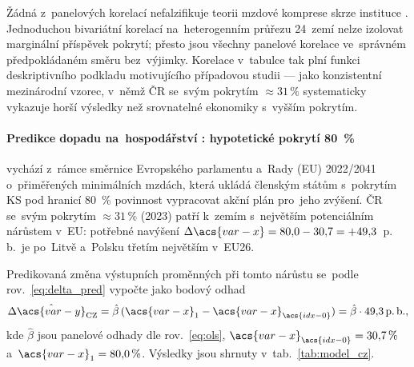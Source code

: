 Žádná z~panelových korelací nefalzifikuje teorii mzdové komprese skrze
instituce . Jednoduchou bivariátní korelací na~heterogenním průřezu
24~zemí nelze izolovat marginální příspěvek pokrytí; přesto jsou všechny
panelové korelace ve~správném předpokládaném směru bez~výjimky. Korelace
v~tabulce tak plní funkci deskriptivního podkladu motivujícího případovou
studii  --- jako konzistentní mezinárodní vzorec, v~němž \Ac{ČR}
se~svým pokrytím $\approx 31\,\%$ systematicky vykazuje horší výsledky než
srovnatelné ekonomiky s~vyšším pokrytím.

\paragraph{Predikce dopadu na~hospodářství : hypotetické pokrytí 80~\%}\label{par:predikce} vychází z~rámce směrnice Evropského parlamentu a~Rady (\acs{EU}) 2022/2041 o~přiměřených
minimálních mzdách, která ukládá členským státům
s~pokrytím \acs{KS} pod hranicí 80~\% povinnost vypracovat akční plán
pro~jeho zvýšení. \Ac{ČR} se~svým pokrytím $\approx 31\,\%$ (2023) patří
k~zemím s~největším potenciálním nárůstem v~\acs{EU}: potřebné navýšení
$\Delta\acs{var-x} = 80{,}0 - 30{,}7 = +49{,}3$~p.\,b.\ je po~Litvě a~Polsku
třetím největším v~\acs{EU}26.~\cite{eu_directive_2022_2041}

Predikovaná změna výstupních proměnných při tomto nárůstu se~podle
rov.~\eqref{eq:delta_pred} vypočte jako bodový odhad
\begin{equation}\label{eq:model_cz}
  \Delta\hat{\acs{var-y}}_{\text{CZ}}
    = \hat{\beta}\,(\acs{var-x}_{1} - \acs{var-x}_{\acs{idx-0}})
    = \hat{\beta} \cdot 49{,}3\,\text{p.\,b.},
\end{equation}
kde $\hat{\beta}$ jsou panelové odhady dle rov.~\eqref{eq:ols},
$\acs{var-x}_{\acs{idx-0}} = 30{,}7\,\%$ a~$\acs{var-x}_{1} = 80{,}0\,\%$.
Výsledky jsou shrnuty v~tab.~\ref{tab:model_cz}.



